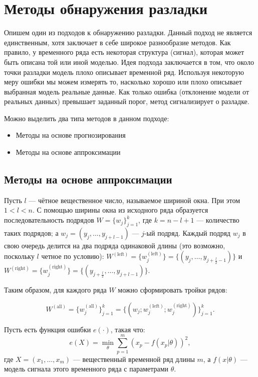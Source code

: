 \documentclass[%
12pt,
master,  %
natbib,      %
subf,        %
substylefile = spbu.rtx,
href,        %
colorlinks,  %
]{disser}
\begin{document}
\section{Методы обнаружения разладки}


Опишем один из подходов к обнаружению разладки. Данный подход не является единственным, хотя заключает в себе широкое разнообразие методов. Как правило, у временного ряда есть некоторая структура (сигнал), которая может быть описана той или иной моделью. Идея подхода заключается в том, что около точки разладки модель плохо описывает временной ряд. Используя некоторую меру ошибки мы можем измерять то, насколько хорошо или плохо описывает выбранная модель реальные данные. Как только ошибка (отклонение модели от реальных данных) превышает заданный порог, метод сигнализирует о разладке.

Можно выделить два типа методов в данном подходе:
\begin{itemize}
	\item Методы на основе прогнозирования
	\item Методы на основе аппроксимации
\end{itemize}

\subsection{Методы на основе аппроксимации}

Пусть $l$ --- чётное вещественное число, называемое шириной окна. При этом  $ 1 < l < n $. С помощью ширины окна из исходного ряда образуется последовательность подрядов $W = \{ w_j \}_{j=1}^k$, где $k = n - l + 1$ --- количество таких подрядов; а $ w_j = (y_j, \dots, y_{j+l-1}) $ --- $j$-ый подряд. Каждый подряд  $w_j$  в свою очередь делится на два подряда одинаковой длины (это возможно, поскольку $l$ четное по условию): $ W^{\mathrm{(left)}} = \{w_j^{\mathrm{(left)}} \}  =  \{(y_j, \dots, y_{j+\frac{l}{2}-1}) \}$ и $W^{\mathrm{(right)}} = \{w_j^{\mathrm{(right)}} \} = \{(y_{j+\frac{l}{2}}, \dots, y_{j+l-1}) \}$.

Таким образом, для каждого ряда $W$ можно сформировать тройки рядов: 

\begin{equation*}
W^{\mathrm{(all)}} = \{w_j^{\mathrm{(all)}} \}_{j=1}^k =  \{(w_j; w_j^{\mathrm{(left)}}; w_j^{\mathrm{(right)}}) \}_{j=1}^k. 
\end{equation*}

Пусть есть функция ошибки $e(\cdot)$, такая что:
\begin{equation*}
e(X) = \min_{\theta}{\sum_{p=1}^m(x_p - f(x_p | \theta))^2 },
\end{equation*}
где $X = (x_1, \dots, x_m)$ ---  вещественный временной ряд длины $m$, а $f(x | \theta)$ --- модель сигнала этого временного ряда с параметрами $\theta$.
\end{document}
